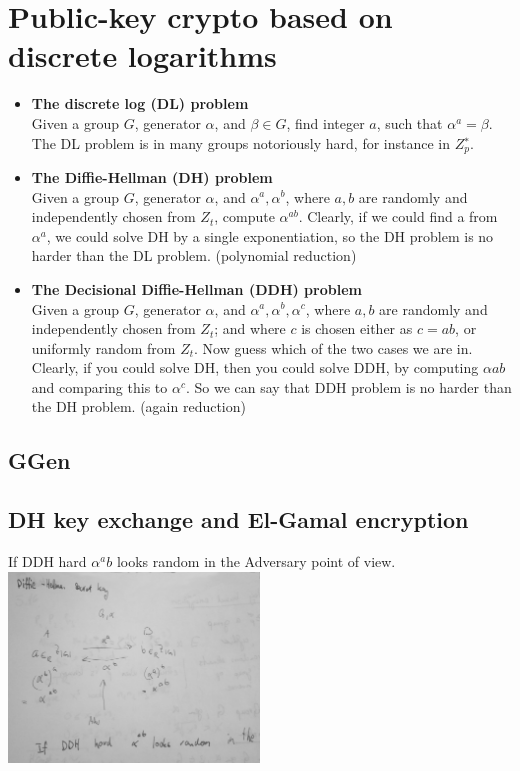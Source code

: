 \documentclass[a4paper,10pt]{article}
\begin{document}
\section*{Public-key crypto based on discrete logarithms}
\begin{itemize}
\item[] \textbf{The discrete log (DL) problem}\\
Given a group $G$, generator $\alpha$, and $\beta \in G$, find integer $a$, such that $\alpha^a = \beta$. The DL problem is in many groups notoriously hard, for instance in $Z^{∗}_p$.
\item[]\textbf{The Diffie-Hellman (DH) problem}\\
Given a group $G$, generator $\alpha$, and $\alpha^a,\alpha^b$, where $a,b$ are randomly and independently chosen from $Z_t$, compute $\alpha^{ab}$.
Clearly, if we could find a from $\alpha^a$, we could solve DH by a single exponentiation, so the DH problem is no harder than the DL problem. (polynomial reduction)
\item[] \textbf{The Decisional Diffie-Hellman (DDH) problem}\\
Given a group $G$, generator $\alpha$, and $\alpha^a,\alpha^b,\alpha^c$, where $a,b$ are randomly and independently chosen from $Z_t$; and where $c$ is chosen either as $c = ab$, or uniformly random from $Z_t$. Now guess which of the two cases we are in. Clearly, if you could solve DH, then you could solve DDH, by computing $\alpha{ab}$ and comparing this to $\alpha^c$. So we can say that DDH problem is no harder than the DH problem. (again reduction)
\end{itemize}
\subsection*{GGen}
\subsection*{DH key exchange and El-Gamal encryption}
If DDH hard $\alpha^ab$ looks random in the Adversary point of view.\\
\includegraphics[width=0.5\textwidth]{DH.jpg}
\end{document}
